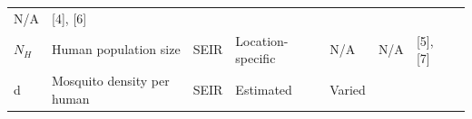 \documentclass[10pt,letterpaper]{article}
\begin{document}
\begin{longtable}[]{@{}llllllll@{}}
\begin{minipage}[t]{0.04\columnwidth}
N/A\strut
\end{minipage} & \begin{minipage}[t]{0.14\columnwidth}\raggedright\strut
{[}4{]}, {[}6{]}\strut
\end{minipage} & \begin{minipage}[t]{0.26\columnwidth}\raggedright\strut
\strut
\end{minipage}\tabularnewline
\begin{minipage}[t]{0.04\columnwidth}\raggedright\strut
\(N_H\)\strut
\end{minipage} & \begin{minipage}[t]{0.17\columnwidth}\raggedright\strut
Human population size\strut
\end{minipage} & \begin{minipage}[t]{0.05\columnwidth}\raggedright\strut
SEIR\strut
\end{minipage} & \begin{minipage}[t]{0.05\columnwidth}\raggedright\strut
Location-specific\strut
\end{minipage} & \begin{minipage}[t]{0.04\columnwidth}\raggedright\strut
N/A\strut
\end{minipage} & \begin{minipage}[t]{0.04\columnwidth}\raggedright\strut
N/A\strut
\end{minipage} & \begin{minipage}[t]{0.14\columnwidth}\raggedright\strut
{[}5{]}, {[}7{]}\strut
\end{minipage} & \begin{minipage}[t]{0.26\columnwidth}\raggedright\strut
\strut
\end{minipage}\tabularnewline
\begin{minipage}[t]{0.04\columnwidth}\raggedright\strut
d\strut
\end{minipage} & \begin{minipage}[t]{0.17\columnwidth}\raggedright\strut
Mosquito density per human\strut
\end{minipage} & \begin{minipage}[t]{0.05\columnwidth}\raggedright\strut
SEIR\strut
\end{minipage} & \begin{minipage}[t]{0.05\columnwidth}\raggedright\strut
Estimated\strut
\end{minipage} & \begin{minipage}[t]{0.04\columnwidth}\raggedright\strut
Varied\strut
\end{minipage} & \begin{minipage}[t]{0.04\columnwidth}\raggedright\strut

\end{minipage}
\end{longtable}
\end{document}
